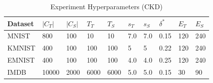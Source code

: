 \begin{table}
\caption{Experiment Hyperparameters (CKD)}
\label{tab:hyperparams-ckd}
\begin{tabular}{llllllllll}
\toprule
Dataset & $|C_T|$ & $|C_S|$ & $T_T$ & $T_S$ & $s_T$ & $s_S$ & $\delta^*$ & $E_T$ & $E_S$ \\
\midrule
MNIST & 800 & 100 & 10 & 10 & 7.0 & 7.0 & 0.15 & 120 & 240 \\
KMNIST & 400 & 100 & 100 & 100 & 5 & 5 & 0.22 & 120 & 240 \\
EMNIST & 400 & 100 & 100 & 100 & 4.0 & 4.0 & 0.25 & 120 & 240 \\
IMDB & 10000 & 2000 & 6000 & 6000 & 5.0 & 5.0 & 0.15 & 30 & 90 \\
\bottomrule
\end{tabular}
\end{table}
